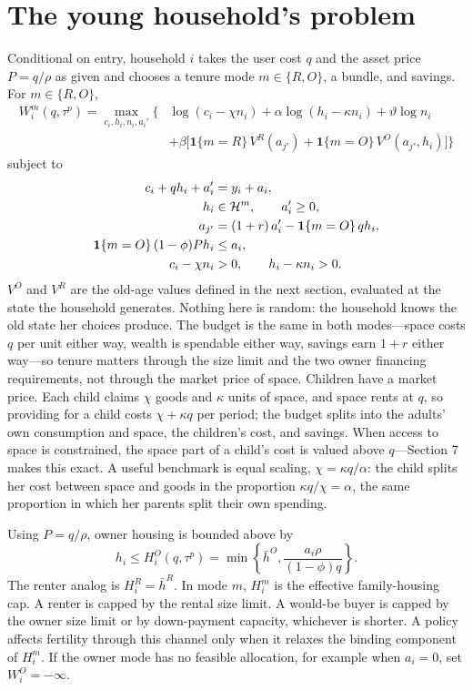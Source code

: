 \documentclass[11pt]{article}
\newcommand{\1}{\mathbf 1}
\newcommand{\HH}{\mathcal H}
\begin{document}
\section{The young household's problem}

Conditional on entry, household $i$ takes the user cost $q$ and the asset price $P=q/\rho$ as given and chooses a tenure mode $m\in\{R,O\}$, a bundle, and savings. For $m\in\{R,O\}$,
\begin{equation}
\begin{aligned}
W_i^m(q,\tau^p)
=
\max_{c_i,h_i,n_i,a_i'}
\Big\{&
\log(c_i-\chi n_i)+\alpha\log(h_i-\kappa n_i)+\vartheta\log n_i\\
&+\beta\big[\1\{m=R\}\,V^R(a_{j'})+\1\{m=O\}\,V^O(a_{j'},h_i)\big]
\Big\}
\end{aligned}
\label{eq:compact_young_problem}
\end{equation}
subject to
\begin{align}
c_i+q h_i+a_i'&=y_i+a_i,
\label{eq:compact_young_budget}\\
h_i&\in\HH^m,
\qquad
a_i'\ge0,
\notag\\
a_{j'}&=(1+r)\,a_i'-\1\{m=O\}\,q h_i,
\label{eq:compact_perceived_transition}\\
\1\{m=O\}\,(1-\phi)P h_i&\le a_i,
\label{eq:compact_owner_dp}\\
c_i-\chi n_i&>0,
\qquad
h_i-\kappa n_i>0.
\notag
\end{align}
$V^O$ and $V^R$ are the old-age values defined in the next section, evaluated at the state the household generates. Nothing here is random: the household knows the old state her choices produce. The budget is the same in both modes---space costs $q$ per unit either way, wealth is spendable either way, savings earn $1+r$ either way---so tenure matters through the size limit and the two owner financing requirements, not through the market price of space. Children have a market price. Each child claims $\chi$ goods and $\kappa$ units of space, and space rents at $q$, so providing for a child costs $\chi+\kappa q$ per period; the budget splits into the adults' own consumption and space, the children's cost, and savings. When access to space is constrained, the space part of a child's cost is valued above $q$---Section 7 makes this exact. A useful benchmark is equal scaling, $\chi=\kappa q/\alpha$: the child splits her cost between space and goods in the proportion $\kappa q/\chi=\alpha$, the same proportion in which her parents split their own spending.

Using $P=q/\rho$, owner housing is bounded above by
\[
h_i\le
H_i^O(q,\tau^p)
=
\min\left\{
\bar h^O,
\frac{a_i\rho}{(1-\phi)q}
\right\}.
\]
The renter analog is $H_i^R=\bar h^R$. In mode $m$, $H_i^m$ is the effective family-housing cap. A renter is capped by the rental size limit. A would-be buyer is capped by the owner size limit or by down-payment capacity, whichever is shorter. A policy affects fertility through this channel only when it relaxes the binding component of $H_i^m$. If the owner mode has no feasible allocation, for example when $a_i=0$, set $W_i^O=-\infty$.
\end{document}
